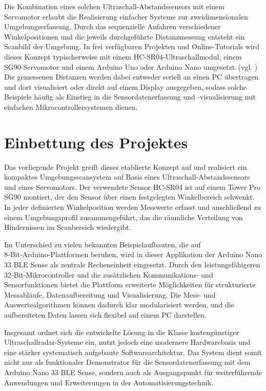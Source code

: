 	Die Kombination eines solchen Ultraschall-Abstandssensors mit einem Servomotor erlaubt die Realisierung einfacher Systeme zur zweidimensionalen Umgebungserfassung. Durch das sequenzielle Anfahren verschiedener Winkelpositionen und die jeweils durchgeführte Distanzmessung entsteht ein Scanbild der Umgebung. In frei verfügbaren Projekten und Online-Tutorials wird dieses Konzept typischerweise mit einem HC-SR04-Ultraschallmodul, einem SG90-Servomotor und einem Arduino Uno oder Arduino Nano umgesetzt.\,(vgl. \cite{projehocam:2015}) Die gemessenen Distanzen werden dabei entweder seriell an einen PC übertragen und dort visualisiert oder direkt auf einem Display ausgegeben, sodass solche Beispiele häufig als Einstieg in die Sensordatenerfassung und -visualisierung mit einfachen Mikrocontrollersystemen dienen.


\chapter{Einbettung des Projektes}


	Das vorliegende Projekt greift dieses etablierte Konzept auf und realisiert ein kompaktes Umgebungs­scansystem auf Basis eines Ultraschall-Abstandssensors und eines Servomotors. Der verwendete Sensor HC‑SR04 ist auf einem Tower Pro SG90 montiert, der den Sensor über einen festgelegten Winkelbereich schwenkt. In jeder definierten Winkelposition werden Messwerte erfasst und anschlie\ss end zu einem Umgebungsprofil zusammengeführt, das die räumliche Verteilung von Hindernissen im Scanbereich wiedergibt.
	
	Im Unterschied zu vielen bekannten Beispielaufbauten, die auf 8‑Bit‑Arduino‑Plattformen beruhen, wird in dieser Applikation der Arduino Nano 33 BLE Sense als zentrale Recheneinheit eingesetzt.\cite{Kaparthi:2021} Durch den leistungsfähigeren 32‑Bit‑Mikrocontroller und die zusätzlichen Kommunikations- und Sensorfunktionen bietet die Plattform erweiterte Möglichkeiten für strukturierte Messabläufe, Datenaufbereitung und Visualisierung. Die Mess- und Auswertealgorithmen können dadurch klar modularisiert werden, und die aufbereiteten Daten lassen sich flexibel auf einem PC darstellen.
	
	Insgesamt ordnet sich die entwickelte Lösung in die Klasse kostengünstiger Ultraschallradar-Systeme ein, nutzt jedoch eine modernere Hardwarebasis und eine stärker systematisch aufgebaute Softwarearchitektur.\cite{Kaparthi:2021} Das System dient somit nicht nur als funktionaler Demonstrator für die Sensordatenerfassung mit dem Arduino Nano 33 BLE Sense, sondern auch als Ausgangspunkt für weiterführende Anwendungen und Erweiterungen in der Automatisierungstechnik.




